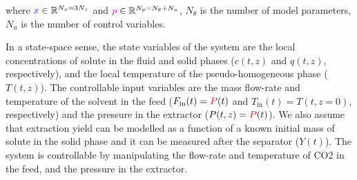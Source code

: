 \documentclass[../Article_Model_Parameters.tex]{subfiles}
\begin{document}
			where ${\color{blue}x} \in \mathbb{R}^{N_x = 3N_z} $ and ${\color{magenta}p} \in \mathbb{R}^{N_p =  N_{\theta} + N_u } $, $N_{\theta}$ is the number of model parameters, $N_{u}$ is the number of control variables.
			
			{\color{blue} In a state-space sense, the state variables of the system are the local concentrations of solute in the fluid and solid phases ($c(t,z)$ and $q(t,z)$, respectively), and the local temperature of the pseudo-homogeneous phase ($T(t,z)$). The controllable input variables are the mass flow-rate and temperature of the solvent in the feed ($F_\text{in}(t) = {\color{red}P}(t)$ and $T_\text{in}(t) = T(t,z=0)$, respectively) and the pressure in the extractor ($P(t,z) ={\color{red}P}(t)$). {\color{red}We also assume that extraction yield can be modelled as a function of a known initial mass of solute in the solid phase and it can be measured after the separator ($Y(t)$).} The system is controllable by manipulating the flow-rate and temperature of CO2 in the feed, and the pressure in the extractor. }
			
			\fi
			
\end{document}

